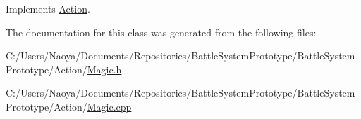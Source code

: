 Implements \hyperlink{class_action_aac84ff5e2103bbe0067df14b4a302a1d}{Action}.



The documentation for this class was generated from the following files\+:\begin{DoxyCompactItemize}
\item 
C\+:/\+Users/\+Naoya/\+Documents/\+Repositories/\+Battle\+System\+Prototype/\+Battle\+System\+Prototype/\+Action/\hyperlink{_magic_8h}{Magic.\+h}\item 
C\+:/\+Users/\+Naoya/\+Documents/\+Repositories/\+Battle\+System\+Prototype/\+Battle\+System\+Prototype/\+Action/\hyperlink{_magic_8cpp}{Magic.\+cpp}\end{DoxyCompactItemize}
